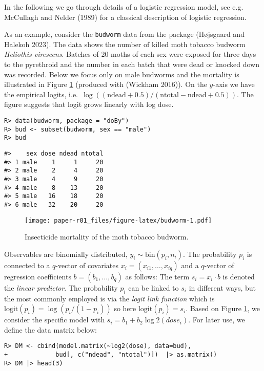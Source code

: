 In the following we go through details of a logistic regression model,
see e.g. McCullagh and Nelder (1989) for a classical description of logistic
regression.

As an example, consider the \texttt{budworm} data from the  package (Højsgaard and Halekoh 2023).
The data shows the number of killed moth tobacco budworm
\emph{Heliothis virescens}. Batches of 20 moths of each sex were
exposed for three days to the pyrethroid and the number in each batch
that were dead or knocked down was recorded.
Below we focus only on male budworms and the mortality is illustrated
in Figure \ref{fig:budworm} (produced with  (Wickham 2016)). On the \(y\)-axis we have the empirical
logits, i.e.~\(\log((\text{ndead} + 0.5)/(\text{ntotal}-\text{ndead} + 0.5))\). The figure suggests that logit grows linearly with log dose.

\begin{verbatim}
R> data(budworm, package = "doBy")
R> bud <- subset(budworm, sex == "male")
R> bud
\end{verbatim}

\begin{verbatim}
#>    sex dose ndead ntotal
#> 1 male    1     1     20
#> 2 male    2     4     20
#> 3 male    4     9     20
#> 4 male    8    13     20
#> 5 male   16    18     20
#> 6 male   32    20     20
\end{verbatim}

\begin{figure}
\centering
\texttt{[image: paper-r01\_files/figure-latex/budworm-1.pdf]}
\caption{\label{fig:budworm}Insecticide mortality of the moth tobacco budworm.}
\end{figure}

Observables are binomially distributed, \(y_i \sim \text{bin}(p_i, n_i)\). The probability \(p_i\) is connected to a \(q\)-vector of
covariates \(x_i=(x_{i1}, \dots, x_{iq})\) and a \(q\)-vector of
regression coefficients \(b=(b_1, \dots, b_q)\) as follows: The term
\(s_i = x_i \cdot b\) is denoted the \emph{linear predictor}. The
probability \(p_i\) can be linked to \(s_i\) in different ways, but the
most commonly employed is via the \emph{logit link function} which is
\(\text{logit}(p_i) = \log(p_i/(1-p_i))\) so here \(\text{logit}(p_i) = s_i\). Based on Figure \ref{fig:budworm}, we consider the specific
model with \(s_i = b_1 + b_2 \log2(dose_i)\). For later use, we define the data matrix below:

\begin{verbatim}
R> DM <- cbind(model.matrix(~log2(dose), data=bud),
+             bud[, c("ndead", "ntotal")])  |> as.matrix()
R> DM |> head(3)
\end{verbatim}


